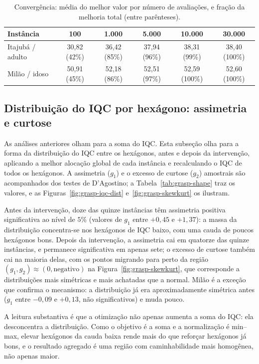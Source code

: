 \documentclass[11pt,a4paper]{article}
\begin{document}
\begin{table}[htbp]
\centering
\caption{Convergência: média do melhor valor por número de avaliações, e fração da melhoria total (entre parênteses).}
\label{tab:grasp-conv}
\renewcommand{\arraystretch}{1.2}
\begin{tabular}{@{}l c c c c c@{}}
\toprule
Instância & 100 & 1.000 & 5.000 & 10.000 & 30.000 \\
\midrule
Itajubá / adulto & 30,82 (42\%) & 36,42 (85\%) & 37,94 (96\%) & 38,31 (99\%) & 38,40 (100\%) \\
Milão / idoso & 50,91 (45\%) & 52,18 (86\%) & 52,51 (97\%) & 52,59 (100\%) & 52,60 (100\%) \\
\bottomrule
\end{tabular}
\end{table}

\subsection{Distribuição do IQC por hexágono: assimetria e curtose}
\label{sec:grasp-iqc-shape}

As análises anteriores olham para a soma do IQC. Esta subseção olha para a forma da distribuição do IQC entre os hexágonos, antes e depois da intervenção, aplicando a melhor alocação global de cada instância e recalculando o IQC de todos os hexágonos. A assimetria ($g_1$) e o excesso de curtose ($g_2$) amostrais são acompanhados dos testes de D'Agostino; a Tabela~\ref{tab:grasp-shape} traz os valores, e as Figuras~\ref{fig:grasp-iqc-dist} e~\ref{fig:grasp-skewkurt} os ilustram.

Antes da intervenção, doze das quinze instâncias têm assimetria positiva significativa ao nível de $5\%$ (valores de $g_1$ entre $+0{,}45$ e $+1{,}37$): a massa da distribuição concentra-se nos hexágonos de IQC baixo, com uma cauda de poucos hexágonos bons. Depois da intervenção, a assimetria cai em quatorze das quinze instâncias, e permanece significativa em apenas sete; o excesso de curtose também cai na maioria delas, com os pontos migrando para perto da região $(g_1, g_2) \approx (0, \text{negativo})$ na Figura~\ref{fig:grasp-skewkurt}, que corresponde a distribuições mais simétricas e mais achatadas que a normal. Milão é a exceção que confirma o mecanismo: a distribuição já era aproximadamente simétrica antes ($g_1$ entre $-0{,}09$ e $+0{,}13$, não significativos) e muda pouco.

A leitura substantiva é que a otimização não apenas aumenta a soma do IQC: ela desconcentra a distribuição. Como o objetivo é a soma e a normalização é min--max, elevar hexágonos da cauda baixa rende mais do que reforçar hexágonos já bons, e o resultado agregado é uma região com caminhabilidade mais homogênea, não apenas maior.
\end{document}
